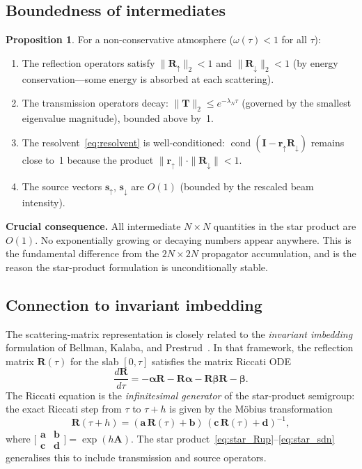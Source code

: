\documentclass[11pt,a4paper]{article}
\newcommand{\cond}{\operatorname{cond}}
\newcommand{\vect}[1]{\bm{#1}}
\newcommand{\mat}[1]{\mathbf{#1}}
\theoremstyle{definition}
\newtheorem{proposition}{Proposition}
\begin{document}
\subsection{Boundedness of intermediates}

\begin{proposition}\label{prop:bounded}
For a non-conservative atmosphere ($\omega(\tau)<1$ for all $\tau$):
\begin{enumerate}[nosep]
\item The reflection operators satisfy $\|\mat{R}_\uparrow\|_2<1$
  and $\|\mat{R}_\downarrow\|_2<1$ (by energy conservation---some
  energy is absorbed at each scattering).
\item The transmission operators decay:
  $\|\mat{T}\|_2\leq e^{-\lambda_N\tau}$ (governed by the
  smallest eigenvalue magnitude), bounded above by~1.
\item The resolvent~\eqref{eq:resolvent} is well-conditioned:
  $\cond(\mat{I}-\mat{r}_\uparrow\mat{R}_\downarrow)$ remains
  close to~1 because the product
  $\|\mat{r}_\uparrow\|\cdot\|\mat{R}_\downarrow\|<1$.
\item The source vectors $\vect{s}_\uparrow$, $\vect{s}_\downarrow$
  are $O(1)$ (bounded by the rescaled beam intensity).
\end{enumerate}
\end{proposition}

\textbf{Crucial consequence.}  All intermediate $N\!\times\!N$
quantities in the star product are $O(1)$.  No exponentially growing
or decaying numbers appear anywhere.  This is the fundamental
difference from the $2N\!\times\!2N$ propagator accumulation, and is
the reason the star-product formulation is unconditionally stable.

\subsection{Connection to invariant imbedding}

The scattering-matrix representation is closely related to the
\emph{invariant imbedding} formulation of Bellman, Kalaba, and
Prestrud~\cite{bellman1960}.  In that framework, the reflection
matrix $\mat{R}(\tau)$ for the slab $[0,\tau]$ satisfies the matrix
Riccati ODE
\begin{equation}\label{eq:riccati}
  \frac{d\mat{R}}{d\tau}
  = -\mat{\alpha}\mat{R} - \mat{R}\mat{\alpha}
    - \mat{R}\mat{\beta}\mat{R} - \mat{\beta}.
\end{equation}
The Riccati equation is the \emph{infinitesimal generator} of the
star-product semigroup: the exact Riccati step from $\tau$ to
$\tau+h$ is given by the M\"obius transformation
\begin{equation}\label{eq:mobius}
  \mat{R}(\tau+h)
  = (\mat{a}\,\mat{R}(\tau)+\mat{b})\,
    (\mat{c}\,\mat{R}(\tau)+\mat{d})^{-1},
\end{equation}
where $\bigl[\begin{smallmatrix}\mat{a}&\mat{b}\\
\mat{c}&\mat{d}\end{smallmatrix}\bigr]=\exp(h\mat{A})$.
The star product~\eqref{eq:star_Rup}--\eqref{eq:star_sdn}
generalises this to include transmission and source operators.
\end{document}

